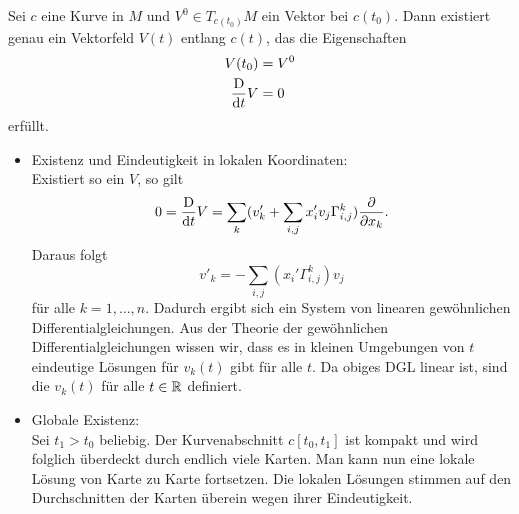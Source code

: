 
\Prop{}
Sei $c$ eine Kurve in $M$ und $V^0\in T_{c(t_0)}M$ ein Vektor bei $c(t_0)$.
Dann existiert genau ein Vektorfeld $V(t)$ entlang $c(t)$, das die Eigenschaften
\begin{align*}
V(t_0) &= V^0\\
\frac{\text{D}}{\text{d} t} V &= 0
\end{align*}
erfüllt.
\begin{Beweis}{}
\begin{itemize}
	\item Existenz und Eindeutigkeit in lokalen Koordinaten:\\
	Existiert so ein $V$, so gilt
	\begin{align*}
	0 = \frac{\text{D}}{\text{d} t} V=\sum_k (v'_k + \sum_{i,j} x_i'v_j \Gamma_{i,j}^k) \frac{\partial }{\partial x_k}.
	\end{align*}
	Daraus folgt
	\[ v'_k = - \sum_{i,j} (x_i' \Gamma_{i,j}^k) v_j \]
	für alle $k = 1,\ldots, n$. Dadurch ergibt sich ein System von linearen gewöhnlichen Differentialgleichungen. Aus der Theorie der gewöhnlichen Differentialgleichungen wissen wir, dass es in kleinen Umgebungen von $t$ eindeutige Lösungen für $v_k(t)$ gibt für alle $t$. Da obiges DGL linear ist, sind die $v_k(t)$ für alle $t\in \mathbb{R}$ definiert.
	\item Globale Existenz:\\
	Sei $t_1 > t_0$ beliebig. Der Kurvenabschnitt $c[t_0, t_1]$ ist kompakt und wird folglich überdeckt durch endlich viele Karten. Man kann nun eine lokale Lösung von Karte zu Karte fortsetzen. Die lokalen Lösungen stimmen auf den Durchschnitten der Karten überein wegen ihrer Eindeutigkeit.
\end{itemize}
\end{Beweis}

